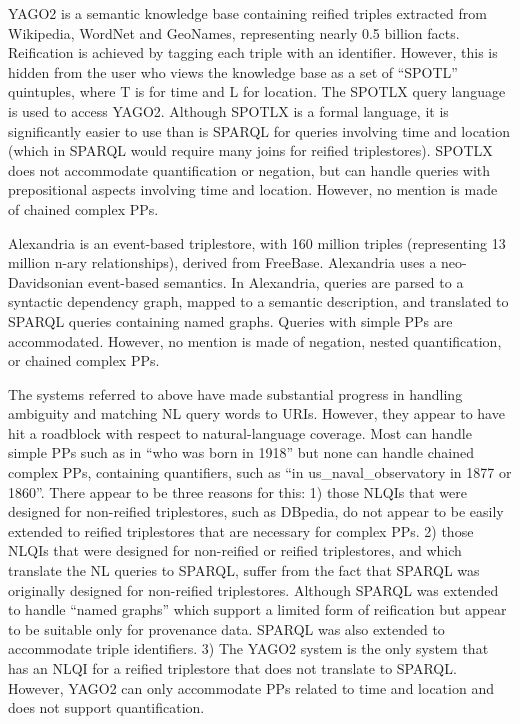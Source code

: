\documentclass[../main.tex]{subfiles}
\begin{document}
\begin{refsection}
YAGO2 \cite{hoffart2013yago2} is a semantic knowledge base containing reified triples extracted from Wikipedia, WordNet and GeoNames, representing nearly 0.5 billion facts. Reification is achieved by tagging each triple with an identifier. However, this is hidden from the user who views the knowledge base as a set of ``SPOTL'' quintuples, where T is for time and L for location. The SPOTLX query language is used to access YAGO2. Although SPOTLX is a formal language, it is significantly easier to use than is SPARQL for queries involving time and location (which in SPARQL would require many joins for reified triplestores). SPOTLX does not accommodate quantification or negation, but can handle queries with prepositional aspects involving time and location. However, no mention is made of chained complex PPs.

Alexandria \cite{wendt2012linguistic} is an event-based triplestore, with 160 million triples (representing 13 million n-ary relationships), derived from FreeBase. Alexandria uses a neo-Davidsonian \cite{parsons1990events} event-based semantics. In Alexandria, queries are parsed to a syntactic dependency graph, mapped to a semantic description, and translated to SPARQL queries containing named graphs. Queries with simple PPs are accommodated. However, no mention is made of negation, nested quantification, or chained complex PPs.

The systems referred to above have made substantial progress in handling ambiguity and matching NL query words to URIs. However, they appear to have hit a roadblock with respect to natural-language coverage. Most can handle simple PPs such as in ``who was born in 1918'' but none can handle chained complex PPs, containing quantifiers, such as ``in us\_naval\_observatory in 1877 or 1860''. There appear to be three reasons for this: 1) those NLQIs that were designed for non-reified triplestores, such as DBpedia, do not appear to be easily extended to reified triplestores that are necessary for complex PPs. 2) those NLQIs that were designed for non-reified or reified triplestores, and which translate the NL queries to SPARQL, suffer from the fact that SPARQL was originally designed for non-reified triplestores.  Although SPARQL was extended to handle ``named graphs'' \cite{carroll2005named} which support a limited form of reification but appear to be suitable only for provenance data. SPARQL was also extended to accommodate triple identifiers. 3) The YAGO2 system is the only system that has an NLQI for a reified triplestore that does not translate to SPARQL. However, YAGO2 can only accommodate PPs related to time and location and does not support quantification.



\end{refsection}
\end{document}
